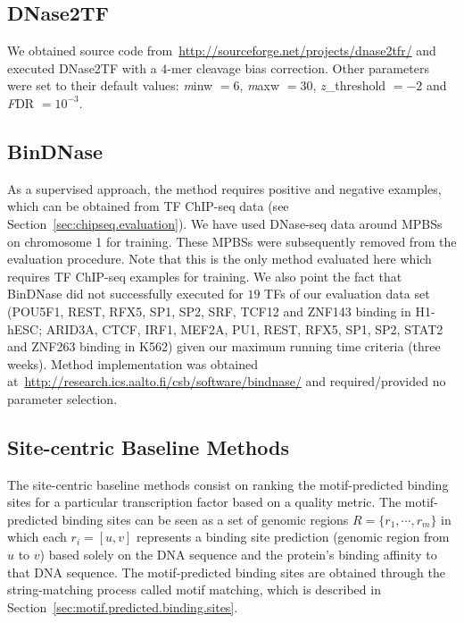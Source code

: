 \subsection{DNase2TF}
\label{sec:dnase2tf}

We obtained source code from~\url{http://sourceforge.net/projects/dnase2tfr/} and executed DNase2TF with a $4$-mer cleavage bias correction. Other parameters were set to their default values: {\emph minw} $= 6$, {\emph maxw} $= 30$, {\emph z\_threshold} $= -2$ and {\emph FDR} $= 10^{-3}$.

\subsection{BinDNase}
\label{sec:bindnase}

As a supervised approach, the method requires positive and negative examples, which can be obtained from TF ChIP-seq data (see Section~\ref{sec:chipseq.evaluation}). We have used DNase-seq data around MPBSs on chromosome 1 for training. These MPBSs were subsequently removed from the evaluation procedure. Note that this is the only method evaluated here which requires TF ChIP-seq examples for training. We also point the fact that BinDNase did not successfully executed for $19$ TFs of our evaluation data set (POU5F1, REST, RFX5, SP1, SP2, SRF, TCF12 and ZNF143 binding in H1-hESC; ARID3A, CTCF, IRF1, MEF2A, PU1, REST, RFX5, SP1, SP2, STAT2 and ZNF263 binding in K562) given our maximum running time criteria (three weeks). Method implementation was obtained at~\url{http://research.ics.aalto.fi/csb/software/bindnase/} and required/provided no parameter selection.

\subsection{Site-centric Baseline Methods}
\label{sec:sitecentric.baseline.methods}

The site-centric baseline methods consist on ranking the motif-predicted binding sites for a particular transcription factor based on a quality metric. The motif-predicted binding sites can be seen as a set of genomic regions $R = \{ {r}_{1}, \cdots, {r}_{m} \}$ in which each ${r}_{i} = [u,v]$ represents a binding site prediction (genomic region from $u$ to $v$) based solely on the DNA sequence and the protein's binding affinity to that DNA sequence. The motif-predicted binding sites are obtained through the string-matching process called motif matching, which is described in Section~\ref{sec:motif.predicted.binding.sites}.

